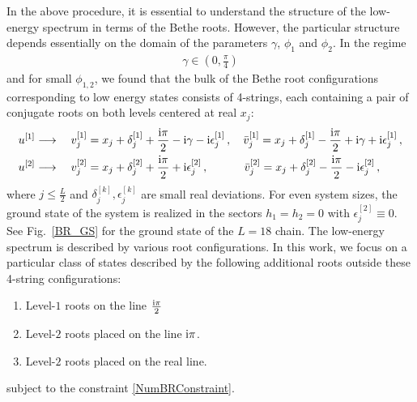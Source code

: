 \documentclass[12pt]{article}
\numberwithin{equation}{section}
\newcommand{\BR}[2]{u^{[#1]}_{#2}}
\newcommand{\BRv}[2]{v^{[#1]}_{#2}}
\newcommand{\BRvbar}[2]{\bar{v}^{[#1]}_{#2}}
\newcommand{\ri}{{\rm i}}
\begin{document}
In the above procedure, it is essential to understand the structure of the low-energy spectrum in terms of the Bethe roots. However, the particular structure depends essentially on the domain of the parameters $\gamma$, $\phi_1$ and $\phi_2$. In the regime
\begin{align}
 \gamma \in (0,\tfrac{\pi}{4}) \label{Parameter_Domain}
\end{align}
and for small $\phi_{1,2}$, we found that the bulk of the Bethe root configurations corresponding to low energy states consists of 4-strings, each containing a pair of conjugate roots on both levels centered at real $x_j$: 
\begin{equation}
\label{BR_GS_1}
\begin{aligned}
  &\BR{1}{} \longrightarrow\quad \BRv{1}{j}=x_j+\delta^{[1]}_j+ \frac{\ri\pi}{2}-\ri\gamma-\ri\epsilon^{[1]}_j\,, \quad \BRvbar{1}{j}=x_j+\delta^{[1]}_j- \frac{\ri\pi}{2}+\ri\gamma+\ri\epsilon^{[1]}_j\,, \\
  &\BR{2}{} \longrightarrow  \quad  \BRv{2}{j}=x_j+\delta^{[2]}_j+\frac{\ri \pi}{2}+\ri\epsilon^{[2]}_j\,, \qquad\quad\, \BRvbar{2}{j}=x_j+\delta^{[2]}_j-\frac{\ri \pi}{2}-\ri\epsilon^{[2]}_j \,,
\end{aligned}
\end{equation}
where $j\le \frac{L}{2}$ and $\delta^{[k]}_j,\epsilon^{[k]}_j$ are small real deviations. For even system sizes, the ground state of the system is realized in the sectors $h_1=h_2=0$ with $\epsilon^{[2]}_j\equiv 0 $. See  Fig.~\ref{BR_GS} for the ground state of the $L=18$ chain. The low-energy spectrum is described by various root configurations. In this work, we focus on a particular class of states described by the following additional roots outside these 4-string configurations:
\begin{enumerate}[label=\roman*)]
    \item \label{i} Level-$1$ roots on the line $\frac{\ri \pi}{2}$ 
    \item \label{ii} Level-$2$ roots placed on the line $\ri \pi$. 
    \item \label{iii} Level-$2$ roots placed on the real line. 
\end{enumerate}
subject to the constraint \eqref{NumBRConstraint}.
\end{document}
